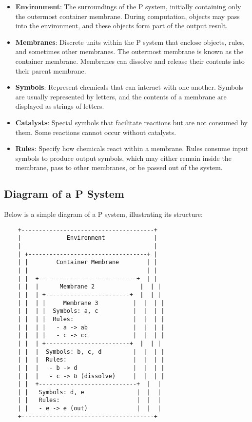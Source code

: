 \documentclass[12pt, oneside]{book}
\begin{document}
\begin{itemize}
	\item \textbf{Environment}: The surroundings of the P system, initially containing only the outermost container membrane. During computation, objects may pass into the environment, and these objects form part of the output result.
	
	\item \textbf{Membranes}: Discrete units within the P system that enclose objects, rules, and sometimes other membranes. The outermost membrane is known as the container membrane. Membranes can dissolve and release their contents into their parent membrane.
	
	\item \textbf{Symbols}: Represent chemicals that can interact with one another. Symbols are usually represented by letters, and the contents of a membrane are displayed as strings of letters.
	
	\item \textbf{Catalysts}: Special symbols that facilitate reactions but are not consumed by them. Some reactions cannot occur without catalysts.
	
	\item \textbf{Rules}: Specify how chemicals react within a membrane. Rules consume input symbols to produce output symbols, which may either remain inside the membrane, pass to other membranes, or be passed out of the system.
\end{itemize}

\subsection{Diagram of a P System}

Below is a simple diagram of a P system, illustrating its structure:

\begin{lstlisting}
	+--------------------------------------+
	|             Environment              |
	|                                      |
	| +----------------------------------+ |
	| |        Container Membrane        | |
	| |                                  | |
	| |  +----------------------------+  | |
	| |  |      Membrane 2             |  | |
	| |  | +------------------------+  |  | |
	| |  | |     Membrane 3          |  |  | |
	| |  | |  Symbols: a, c          |  |  | |
	| |  | |  Rules:                 |  |  | |
	| |  | |   - a -> ab             |  |  | |
	| |  | |   - c -> cc             |  |  | |
	| |  | +------------------------+  |  | |
	| |  |  Symbols: b, c, d         |  |  | |
	| |  |  Rules:                   |  |  | |
	| |  |   - b -> d                |  |  | |
	| |  |   - c -> δ (dissolve)     |  |  | |
	| |  +----------------------------+  |  |
	| |   Symbols: d, e               |  |  |
	| |   Rules:                      |  |  |
	| |   - e -> e (out)              |  |  |
	+--------------------------------------+
\end{lstlisting}
\end{document}
